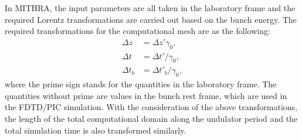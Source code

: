 In MITHRA, the input parameters are all taken in the laboratory frame and the required Lorentz transformations are carried out based on the bunch energy.
%
The required transformations for the computational mesh are as the following:
%
\begin{align}
\Delta z & = \Delta z' \gamma_0,  \label{LorentzTransformB}\\
\Delta t & = \Delta t' / \gamma_0,  \\
\Delta t_b & = \Delta t'_b / \gamma_0,
\end{align}
%
where the prime sign stands for the quantities in the laboratory frame.
%
The quantities without prime are values in the bunch rest frame, which are used in the FDTD/PIC simulation.
%
With the consideration of the above transformations, the length of the total computational domain along the undulator period and the total simulation time is also transformed similarly.

